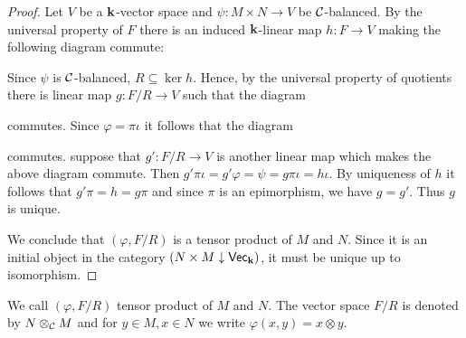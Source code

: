 \begin{proof}
    Let $V$ be a $\mathbf{k}$-vector space and $\psi\colon M\times N\to V$ be $\mathcal{C}$-balanced.
    By the universal property of $F$ there is an induced $\mathbf{k}$-linear map $h\colon F\to V$ making the following diagram commute:
    \begin{center}
    \end{center}
    Since $\psi$ is $\mathcal{C}$-balanced, $R\subseteq\ker h$. 
    Hence, by the universal property of quotients there is linear map $g:F/R\to V$ such that the diagram
    \begin{center}
    \end{center}
    commutes. 
    Since $\varphi=\pi\iota$ it follows that the diagram
    \begin{center}
    \end{center}
    commutes. 
    suppose that $g'\colon F/R\to V$ is another linear map which makes the above diagram commute. 
    Then $g'\pi\iota=g'\varphi=\psi=g\pi\iota=h\iota$. 
    By uniqueness of $h$ it follows that $g'\pi=h=g\pi$ and since $\pi$ is an epimorphism, we have $g=g'$.
    Thus $g$ is unique.
    
    We conclude that $(\varphi,F/R)$ is a tensor product of $M$ and $N$. 
    Since it is an initial object in the category $\left(N\times M\downarrow \normalfont\mathsf{Vec}_{\mathbf{k}}\right)$, it must be unique up to isomorphism.
\end{proof}
We call $(\varphi, F/R)$  tensor product of $M$ and $N$. 
The vector space $F/R$ is denoted by $N\otimes_{\mathcal{C}} M$ and for $y\in M, x\in N$ we write $\varphi(x,y)=x\otimes y$.


